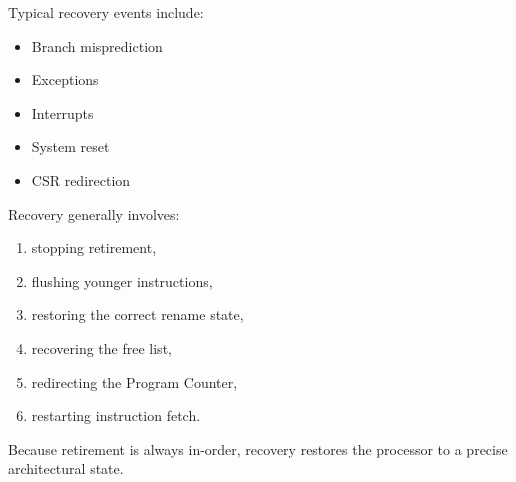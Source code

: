 Typical recovery events include:
\begin{itemize}
  \item Branch misprediction
  \item Exceptions
  \item Interrupts
  \item System reset
  \item CSR redirection
\end{itemize}

Recovery generally involves:
\begin{enumerate}
  \item stopping retirement,
  \item flushing younger instructions,
  \item restoring the correct rename state,
  \item recovering the free list,
  \item redirecting the Program Counter,
  \item restarting instruction fetch.
\end{enumerate}

Because retirement is always in-order, recovery restores the processor to a precise architectural
state.

\begin{rtlrefs}
\end{rtlrefs}
